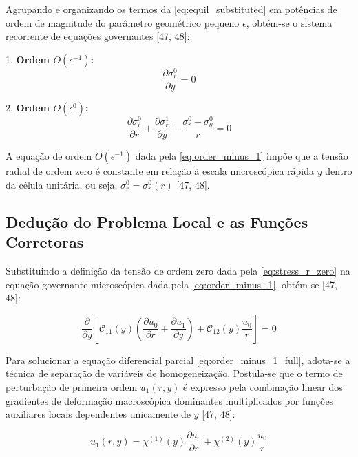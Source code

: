 Agrupando e organizando os termos da \eqref{eq:equil_substituted} em potências de ordem de magnitude do parâmetro geométrico pequeno $\epsilon$, obtém-se o sistema recorrente de equações governantes [47, 48]:

1. \textbf{Ordem $O(\epsilon^{-1})$:}
\begin{equation}
  \frac{\partial \sigma_r^0}{\partial y} = 0
  \label{eq:order_minus_1}
\end{equation}

2. \textbf{Ordem $O(\epsilon^0)$:}
\begin{equation}
  \frac{\partial \sigma_r^0}{\partial r} + \frac{\partial \sigma_r^1}{\partial y} + \frac{\sigma_r^0 - \sigma_\theta^0}{r} = 0
  \label{eq:order_zero}
\end{equation}

A equação de ordem $O(\epsilon^{-1})$ dada pela \eqref{eq:order_minus_1} impõe que a tensão radial de ordem zero é constante em relação à escala microscópica rápida $y$ dentro da célula unitária, ou seja, $\sigma_r^0 = \sigma_r^0 (r)$ [47, 48].

\subsection{Dedução do Problema Local e as Funções Corretoras}

Substituindo a definição da tensão de ordem zero dada pela \eqref{eq:stress_r_zero} na equação governante microscópica dada pela \eqref{eq:order_minus_1}, obtém-se [47, 48]:

\begin{equation}
  \frac{\partial}{\partial y} \left[ \mathcal{C}_{11}(y) \left( \frac{\partial u_0}{\partial r} + \frac{\partial u_1}{\partial y} \right) + \mathcal{C}_{12}(y) \frac{u_0}{r} \right] = 0
  \label{eq:order_minus_1_full}
\end{equation}

Para solucionar a equação diferencial parcial \eqref{eq:order_minus_1_full}, adota-se a técnica de separação de variáveis de homogeneização. Postula-se que o termo de perturbação de primeira ordem $u_1(r, y)$ é expresso pela combinação linear dos gradientes de deformação macroscópica dominantes multiplicados por funções auxiliares locais dependentes unicamente de $y$ [47, 48]:

\begin{equation}
  u_1(r, y) = \chi^{(1)}(y) \frac{\partial u_0}{\partial r} + \chi^{(2)}(y) \frac{u_0}{r}
  \label{eq:separable_u1}
\end{equation}

